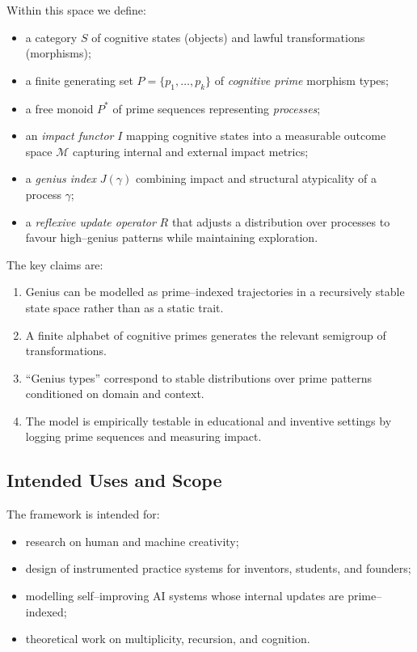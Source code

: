 \documentclass[11pt]{article}
\begin{document}
Within this space we define:
\begin{itemize}[nosep]
  \item a category $S$ of cognitive states (objects) and lawful transformations (morphisms);
  \item a finite generating set $P=\{p_1,\dots,p_k\}$ of \emph{cognitive prime} morphism types;
  \item a free monoid $P^\ast$ of prime sequences representing \emph{processes};
  \item an \emph{impact functor} $I$ mapping cognitive states into a measurable outcome space $\mathcal{M}$ capturing internal and external impact metrics;
  \item a \emph{genius index} $J(\gamma)$ combining impact and structural atypicality of a process $\gamma$;
  \item a \emph{reflexive update operator} $R$ that adjusts a distribution over processes to favour high--genius patterns while maintaining exploration.
\end{itemize}

The key claims are:
\begin{enumerate}[nosep]
  \item Genius can be modelled as prime--indexed trajectories in a recursively stable state space rather than as a static trait.
  \item A finite alphabet of cognitive primes generates the relevant semigroup of transformations.
  \item ``Genius types'' correspond to stable distributions over prime patterns conditioned on domain and context.
  \item The model is empirically testable in educational and inventive settings by logging prime sequences and measuring impact.
\end{enumerate}

\subsection{Intended Uses and Scope}

The framework is intended for:
\begin{itemize}[nosep]
  \item research on human and machine creativity;
  \item design of instrumented practice systems for inventors, students, and founders;
  \item modelling self--improving AI systems whose internal updates are prime--indexed;
  \item theoretical work on multiplicity, recursion, and cognition.
\end{itemize}
\end{document}
